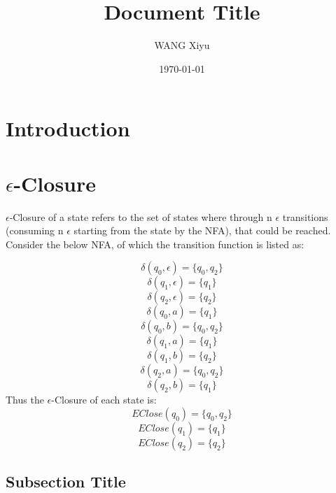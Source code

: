 \documentclass[12pt]{article} %
\title{Document Title}
\author{WANG Xiyu}
\date{\today}
\begin{document}
\maketitle

\tableofcontents %

\section{Introduction}

\section{$\epsilon$-Closure}
$\epsilon$-Closure of a state refers to the set of states where through n $\epsilon$ transitions (consuming n $\epsilon$ starting from the state by the NFA), that could be reached.\newline
Consider the below NFA, of which the transition function is listed as:

\begin{center}
\end{center}
\[\delta(q_0, \epsilon ) = \{q_0, q_2\}\]
\[\delta(q_1, \epsilon ) = \{q_1\}\]
\[\delta(q_2, \epsilon ) = \{q_2\}\]
\[\delta(q_0, a) = \{q_1\}\]
\[\delta(q_0, b) = \{q_0, q_2\}\]
\[\delta(q_1, a) = \{q_1\}\]
\[\delta(q_1, b) = \{q_2\}\]
\[\delta(q_2, a) = \{q_0, q_2\}\]
\[\delta(q_2, b) = \{q_1\}\]
Thus the $\epsilon$-Closure of each state is:
\[EClose(q_0) = \{q_0, q_2\}\]
\[EClose(q_1) = \{q_1\}\]
\[EClose(q_2) = \{q_2\}\]



\subsection{Subsection Title}
\end{document}
